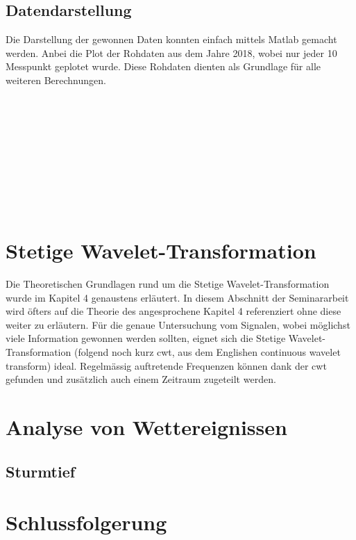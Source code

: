\begin{refsection}
\subsection{Datendarstellung}
Die Darstellung der gewonnen Daten konnten einfach mittels Matlab gemacht werden. Anbei die Plot der Rohdaten aus dem Jahre 2018, wobei nur jeder 10 Messpunkt geplotet wurde. Diese Rohdaten dienten als Grundlage für alle weiteren Berechnungen. 
\\
\\

\\
\\

\\\\

\\
\\

\\
\\

\section{Stetige Wavelet-Transformation}

Die Theoretischen Grundlagen rund um die Stetige Wavelet-Transformation wurde im Kapitel 4 genaustens erläutert. 
In diesem Abschnitt der Seminararbeit wird öfters auf die Theorie des angesprochene Kapitel 4 referenziert ohne diese weiter zu erläutern. 
Für die genaue Untersuchung vom Signalen, wobei möglichst viele Information gewonnen werden sollten, eignet sich die Stetige Wavelet-Transformation (folgend noch kurz cwt, aus dem Englishen continuous wavelet transform)
ideal. 
Regelmässig auftretende Frequenzen können dank der cwt gefunden und zusätzlich auch einem Zeitraum zugeteilt werden.


\section{Analyse von Wettereignissen}

\subsection{Sturmtief}


\section{Schlussfolgerung}

\printbibliography[heading=subbibliography]
\end{refsection}

